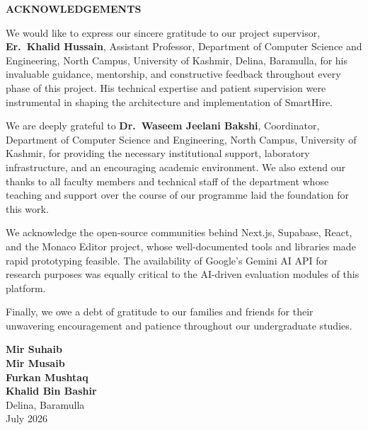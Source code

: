 \begin{center}
    {\Large \bfseries ACKNOWLEDGEMENTS}\\[0.25in]
\end{center}

We would like to express our sincere gratitude to our project supervisor, \textbf{Er.\ Khalid Hussain}, Assistant Professor, Department of Computer Science and Engineering, North Campus, University of Kashmir, Delina, Baramulla, for his invaluable guidance, mentorship, and constructive feedback throughout every phase of this project. His technical expertise and patient supervision were instrumental in shaping the architecture and implementation of SmartHire.

We are deeply grateful to \textbf{Dr.\ Waseem Jeelani Bakshi}, Coordinator, Department of Computer Science and Engineering, North Campus, University of Kashmir, for providing the necessary institutional support, laboratory infrastructure, and an encouraging academic environment. We also extend our thanks to all faculty members and technical staff of the department whose teaching and support over the course of our programme laid the foundation for this work.

We acknowledge the open-source communities behind Next.js, Supabase, React, and the Monaco Editor project, whose well-documented tools and libraries made rapid prototyping feasible. The availability of Google's Gemini AI API for research purposes was equally critical to the AI-driven evaluation modules of this platform.

Finally, we owe a debt of gratitude to our families and friends for their unwavering encouragement and patience throughout our undergraduate studies.

\vspace{0.3in}
\begin{flushright}
\textbf{Mir Suhaib}\\
\textbf{Mir Musaib}\\
\textbf{Furkan Mushtaq}\\
\textbf{Khalid Bin Bashir}\\[0.15in]
Delina, Baramulla\\
July 2026
\end{flushright}
\cleardoublepage
